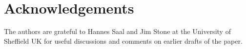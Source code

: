 \documentclass[10pt,letterpaper]{article}
\begin{document}



\section*{Acknowledgements}

The authors are grateful to Hannes Saal and Jim Stone at the University of Sheffield UK for useful discussions and comments on earlier drafts of the paper.


\nolinenumbers

\end{document}

